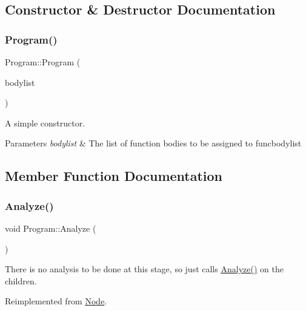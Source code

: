 \subsection{Constructor \& Destructor Documentation}
\mbox{\label{class_program_a0084186bdb7fd8259b3adfbc89a24128}} 
\subsubsection{\texorpdfstring{Program()}{Program()}}
{\footnotesize\ttfamily Program\+::\+Program (\begin{DoxyParamCaption}\item[{\hyperlink{class_list}{List}$<$ \hyperlink{class_func_body}{Func\+Body} $\ast$$>$ $\ast$}]{bodylist }\end{DoxyParamCaption})}

A simple constructor. 
\begin{DoxyParams}{Parameters}
{\em bodylist} & The list of function bodies to be assigned to funcbodylist \\
\hline
\end{DoxyParams}


\subsection{Member Function Documentation}
\mbox{\label{class_program_a7a533446b23a020e661463df819ae49d}} 
\subsubsection{\texorpdfstring{Analyze()}{Analyze()}}
{\footnotesize\ttfamily void Program\+::\+Analyze (\begin{DoxyParamCaption}{ }\end{DoxyParamCaption})\hspace{0.3cm}{\ttfamily [virtual]}}

There is no analysis to be done at this stage, so just calls \hyperlink{class_program_a7a533446b23a020e661463df819ae49d}{Analyze()} on the children. 

Reimplemented from \hyperlink{class_node_a5f88d55c6f253a29def7ccc443d83d47}{Node}.

\mbox{\label{class_program_a4e709dc5cee7a2c28fe3d96694449c59}} 
